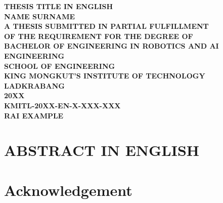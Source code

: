 \documentclass[12pt,a4paper]{report}
\begin{document}
\begin{titlepage}
    \centering
    \vspace*{1in}
    {\fontsize{18pt}{18pt}\bfseries THESIS TITLE IN ENGLISH \\[1.5em]}
    {\fontsize{16pt}{16pt}\bfseries NAME SURNAME \\[1.5em]}
    \vfill
    {\fontsize{16pt}{16pt}\bfseries
    A THESIS SUBMITTED IN PARTIAL FULFILLMENT \\ OF THE REQUIREMENT FOR THE DEGREE OF \\ BACHELOR OF ENGINEERING IN ROBOTICS AND AI ENGINEERING \\ SCHOOL OF ENGINEERING \\ KING MONGKUT'S INSTITUTE OF TECHNOLOGY LADKRABANG \\ 20XX \\ KMITL-20XX-EN-X-XXX-XXX \\ RAI EXAMPLE}
\end{titlepage}

\chapter*{ABSTRACT IN ENGLISH}


\chapter*{Acknowledgement}

\cleardoublepage

\tableofcontents
\listoftables
\listoffigures

\cleardoublepage
{}







\cite{zhang2023design}

\cleardoublepage
{}



\appendix

\end{document}
